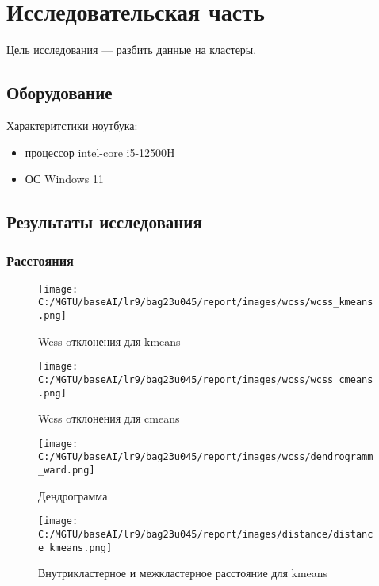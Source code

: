 \chapter{Исследовательская часть}

Цель исследования — разбить данные на кластеры.

\section{Оборудование}

Характеритстики ноутбука:
\begin{itemize}
	\item процессор intel-core i5-12500H \cite{lib:intel}
	\item ОС Windows 11 \cite{lib:windows}
\end{itemize}

\section{Результаты исследования}

\subsection{Расстояния}

\begin{figure}[H]
    \texttt{[image: C:/MGTU/baseAI/lr9/bag23u045/report/images/wcss/wcss\_kmeans.png]}
    \caption{Wcss oтклонения для kmeans}
\end{figure}

\begin{figure}[H]
    \texttt{[image: C:/MGTU/baseAI/lr9/bag23u045/report/images/wcss/wcss\_cmeans.png]}
    \caption{Wcss oтклонения для cmeans}
\end{figure}

\begin{figure}[H]
    \centering
    \texttt{[image: C:/MGTU/baseAI/lr9/bag23u045/report/images/wcss/dendrogramm\_ward.png]}
    \caption{Дендрограмма}
\end{figure}

\begin{figure}[H]
    \texttt{[image: C:/MGTU/baseAI/lr9/bag23u045/report/images/distance/distance\_kmeans.png]}
    \caption{Внутрикластерное и межкластерное расстояние для kmeans}
\end{figure}


